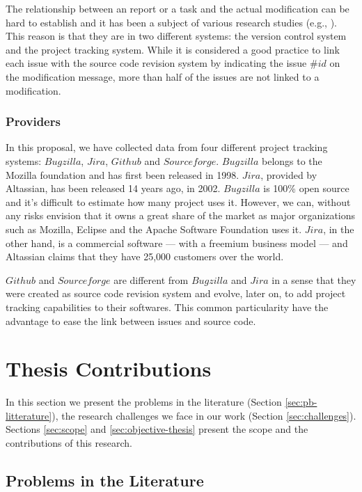 The relationship between an report or a task and the actual modification can be hard to establish and it has been a subject of various research studies (e.g., \cite{Antoniol2002,Bachmann2010,Wu2011}).
This reason is that they are in two different systems: the version control system and the project tracking system.
While it is considered a good practice to link each issue with the source code revision system by indicating the issue $\#id$ on the modification message, more than half of the issues are not linked to a modification\cite{Wu2011}.

\subsubsection{Providers\label{sec:bug-provider}}

 In this proposal, we have collected data from four different project tracking systems: $Bugzilla$, $Jira$, $Github$ and $Sourceforge$.
 $Bugzilla$ belongs to the Mozilla foundation and has first been released in 1998.
 $Jira$, provided by Altassian, has been released 14 years ago, in 2002.
 $Bugzilla$ is 100\% open source and it's difficult to estimate how many project uses it.
 However, we can, without any risks envision that it owns a great share of the market as major organizations such as Mozilla, Eclipse and the Apache Software Foundation uses it.
 $Jira$, in the other hand, is a commercial software --- with a freemium business model --- and Altassian claims that they have 25,000 customers over the world.

$Github$ and $Sourceforge$ are different from $Bugzilla$ and $Jira$ in a sense that they were created as source code revision system and evolve, later on, to add project tracking capabilities to their softwares.
This common particularity have the advantage to ease the link between issues and source code.

\section{Thesis Contributions}

In this section we present the problems in the literature (Section \ref{sec:pb-litterature}), the research challenges we face in our work (Section \ref{sec:challenges}). Sections \ref{sec:scope} and \ref{sec:objective-thesis} present the scope and the contributions of this research.

\subsection{Problems in the Literature\label{sec:pb-litterature}}

